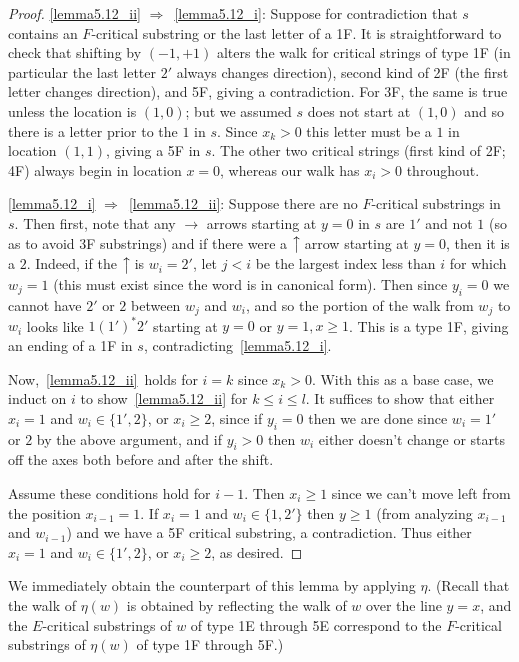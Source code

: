 \documentclass[10pt]{amsart}
\theoremstyle{definition}
\newcommand{\east}[1]{\ensuremath{\xrightarrow{\ #1\ }}}
\newcommand{\north}[1]{\ensuremath{\big \uparrow \!\text{\raisebox{.1ex}{\scriptsize $#1$}}}}
\begin{document}
\begin{proof}
\ref{lemma5.12_ii} $\Rightarrow$~\ref{lemma5.12_i}: Suppose for contradiction that $s$ contains an $F$-critical substring or the last letter of a 1F. It is straightforward to check that shifting by $(-1,+1)$ alters the walk for critical strings of type 1F (in particular the last letter $2'$ always changes direction), second kind of 2F (the first letter changes direction), and 5F, giving a contradiction. For 3F, the same is true unless the location is $(1,0)$; but we assumed $s$ does not start at $(1,0)$ and so there is a letter prior to the $1$ in $s$. Since $x_k>0$ this letter must be a $1$ in location $(1,1)$, giving a 5F in $s$. The other two critical strings (first kind of 2F; 4F) always begin in location $x=0$, whereas our walk has $x_i > 0$ throughout.

\ref{lemma5.12_i} $\Rightarrow$~\ref{lemma5.12_ii}: Suppose there are no $F$-critical substrings in $s$. Then first, note that any $\east{}$ arrows starting at $y=0$ in $s$ are $1'$ and not $1$ (so as to avoid 3F substrings) and if there were a $\north{}$ arrow starting at $y=0$, then it is a $2$. Indeed, if the $\north{}$ is $w_i=2'$, let $j<i$ be the largest index less than $i$ for which $w_j=1$ (this must exist since the word is in canonical form). Then since $y_i=0$ we cannot have $2'$ or $2$ between $w_j$ and $w_i$, and so the portion of the walk from $w_j$ to $w_i$ looks like $1(1')^\ast 2'$ starting at $y=0$ or $y=1,x\ge 1$. This is a type 1F, giving an ending of a 1F in $s$, contradicting~\ref{lemma5.12_i}.

Now,~\ref{lemma5.12_ii}~holds for $i=k$ since $x_k>0$. With this as a base case, we induct on $i$ to show~\ref{lemma5.12_ii} for $k\le i\le l$. It suffices to show that either $x_i=1$ and $w_i\in \{1',2\}$, or $x_i\ge 2$, since if $y_i=0$ then we are done since $w_i=1'$ or $2$ by the above argument, and if $y_i>0$ then $w_i$ either doesn't change or starts off the axes both before and after the shift.

Assume these conditions hold for $i-1$. Then $x_i\ge 1$ since we can't move left from the position $x_{i-1}=1$. If $x_i=1$ and $w_i\in \{1,2'\}$ then $y\ge 1$ (from analyzing $x_{i-1}$ and $w_{i-1}$) and we have a 5F critical substring, a contradiction. Thus either $x_i=1$ and $w_i\in \{1',2\}$, or $x_i\ge 2$, as desired.
\end{proof}

We immediately obtain the counterpart of this lemma by applying $\eta$. (Recall that the walk of $\eta(w)$ is obtained by reflecting the walk of $w$ over the line $y=x$, and the $E$-critical substrings of $w$ of type 1E through 5E correspond to the $F$-critical substrings of $\eta(w)$ of type 1F through 5F.)
\end{document}

